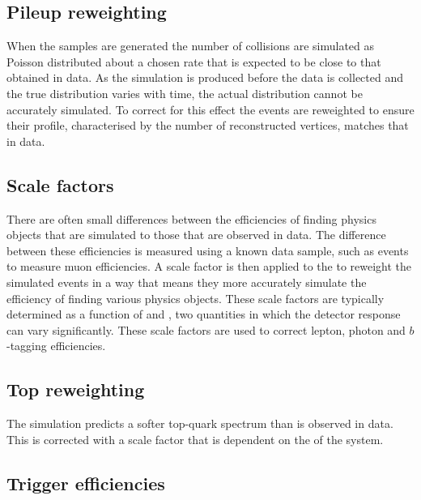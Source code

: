 \subsection{Pileup reweighting}

When the \MC samples are generated the number of \PU collisions are
simulated as Poisson distributed about a chosen rate that is expected
to be close to that obtained in data. As the simulation is produced
before the data is collected and the true \PU distribution varies with
time, the actual distribution cannot be accurately simulated. To
correct for this effect the \MC events are reweighted to ensure their
\PU profile, characterised by the number of reconstructed vertices, matches that in data. 

\subsection{Scale factors}
\label{sec:sfs}

There are often small differences between the efficiencies of finding
physics objects that are simulated to those that are observed in data.
The difference between these efficiencies is measured using a known
data sample, such as \zmumu events to measure muon efficiencies. A
scale factor is then applied to the \MC to reweight the simulated
events in a way that means they more accurately simulate the
efficiency of finding various physics objects. These scale factors are
typically determined as a function of \pT and \eta, two quantities in
which the detector response can vary significantly. These scale
factors are used to correct lepton, photon and $b$-tagging efficiencies.

\subsection{Top \pT reweighting}%

The \ttbar simulation predicts a softer top-quark \pT spectrum than is
observed in data. This is corrected with a scale factor that is
dependent on the \pT of the \ttbar system.

\subsection{Trigger efficiencies}

